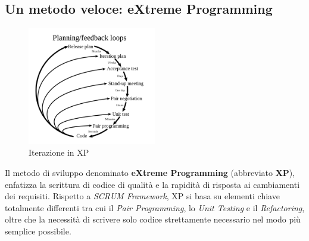 \documentclass[a4paper,12pt]{report}
\begin{document}
			\subsection{Un metodo veloce: eXtreme Programming}
			
				\begin{figure}[h]
					\centering
					\includegraphics[width=0.5\textwidth]{xp_plan}
					\caption{Iterazione in XP}
					\label{fig:xp_plan}
				\end{figure}
			
				Il metodo di sviluppo denominato \textbf{eXtreme Programming} (abbreviato \textbf{XP}), enfatizza la scrittura di codice
				di qualità e la rapidità di risposta ai cambiamenti dei requisiti. Rispetto a \emph{SCRUM Framework}, XP si basa su
				elementi chiave totalmente differenti tra cui il \emph{Pair Programming}, lo \emph{Unit Testing} e il \emph{Refactoring},
				oltre che la necessità di scrivere solo codice strettamente necessario nel modo più semplice possibile.
				
\end{document}
